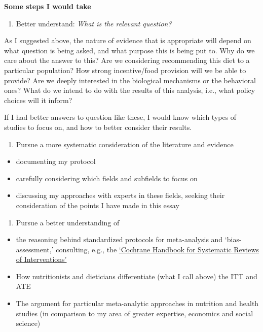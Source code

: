 \documentclass[]{tufte-handout}
\providecommand{\tightlist}{%
  \setlength{\itemsep}{0pt}\setlength{\parskip}{0pt}}
\begin{document}
\hfill\break

\textbf{Some steps I would take}

\begin{enumerate}
\def\labelenumi{\arabic{enumi}.}
\tightlist
\item
  Better understand: \emph{What is the relevant question?}
\end{enumerate}

As I suggested above, the nature of evidence that is appropriate will
depend on what question is being asked, and what purpose this is being
put to. Why do we care about the answer to this? Are we considering
recommending this diet to a particular population? How strong
incentive/food provision will we be able to provide? Are we deeply
interested in the biological mechanisms or the behavioral ones? What do
we intend to do with the results of this analysis, i.e., what policy
choices will it inform?

If I had better answers to question like these, I would know which types
of studies to focus on, and how to better consider their results.

\begin{enumerate}
\def\labelenumi{\arabic{enumi}.}
\setcounter{enumi}{1}
\tightlist
\item
  Pursue a more systematic consideration of the literature and evidence
\end{enumerate}

\begin{itemize}
\tightlist
\item
  documenting my protocol
\item
  carefully considering which fields and subfields to focus on
\item
  discussing my approaches with experts in these fields, seeking their
  consideration of the points I have made in this essay
\end{itemize}

\begin{enumerate}
\def\labelenumi{\arabic{enumi}.}
\setcounter{enumi}{2}
\tightlist
\item
  Pursue a better understanding of
\end{enumerate}

\begin{itemize}
\item
  the reasoning behind standardized protocols for meta-analysis and
  `bias-assessment,' consulting, e.g., the
  \href{https://training.cochrane.org/handbook/current}{`Cochrane
  Handbook for Systematic Reviews of Interventions'}
\item
  How nutritionists and dieticians differentiate (what I call above) the
  ITT and ATE
\item
  The argument for particular meta-analytic approaches in nutrition and
  health studies (in comparison to my area of greater expertise,
  economics and social science)
\end{itemize}
\end{document}
